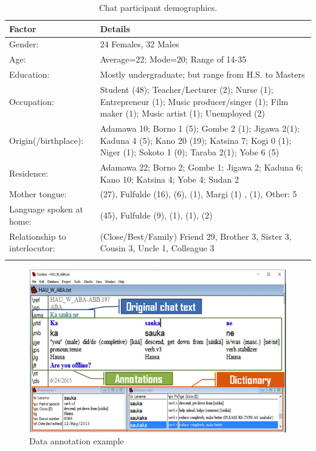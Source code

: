 \documentclass[output=paper,newtxmath,modfonts,nonflat,hidelinks]{langsci/langscibook}
\begin{document}
\begin{table}[p]
\footnotesize
\begin{tabularx}{\textwidth}{lQ}
\lsptoprule
 Factor &  Details\\
\midrule
Gender: & 24 Females, 32 Males\\
\tablevspace
Age: & Average=22; Mode=20; Range of 14-35\\
\tablevspace
Education: & Mostly undergraduate; but range from H.S. to Masters\\
\tablevspace
Occupation: & Student (48); Teacher/Lecturer (2); Nurse (1); Entrepreneur (1); Music producer/singer (1); Film maker (1); Music artist (1); Unemployed (2)\\
\tablevspace
Origin(/birthplace): & Adamawa 10; Borno 1 (5); Gombe 2 (1); Jigawa 2(1); Kaduna 4 (5); Kano 20 (19); Katsina 7; Kogi 0 (1); Niger (1); Sokoto 1 (0); Taraba 2(1); Yobe 6 (5)\\
\tablevspace
Residence: & Adamawa 22; Borno 2; Gombe 1; Jigawa 2; Kaduna 6; Kano 10; Katsina 4; Yobe 4; Sudan 2\\
\tablevspace
Mother tongue: &  (27), Fulfulde (16),  (6),  (1), Margi (1) ,  (1), Other: 5\\
\tablevspace
Language spoken at home: &  (45), Fulfulde (9),  (1),  (1),  (2)\\
\tablevspace
Relationship to interlocutor: & (Close/Best/Family) Friend 29, Brother 3, Sister 3, Cousin 3, Uncle 1, Colleague 3\\
\lspbottomrule
\end{tabularx}  
\caption{Chat participant demographics.}
\label{tab:purvis:1}
\end{table} 

\begin{figure}[p]
\includegraphics[width=.8\textwidth]{figures/purvis-fig1.png}
\caption{Data annotation example}
\label{fig:purvis:1}
\end{figure}
\end{document}
